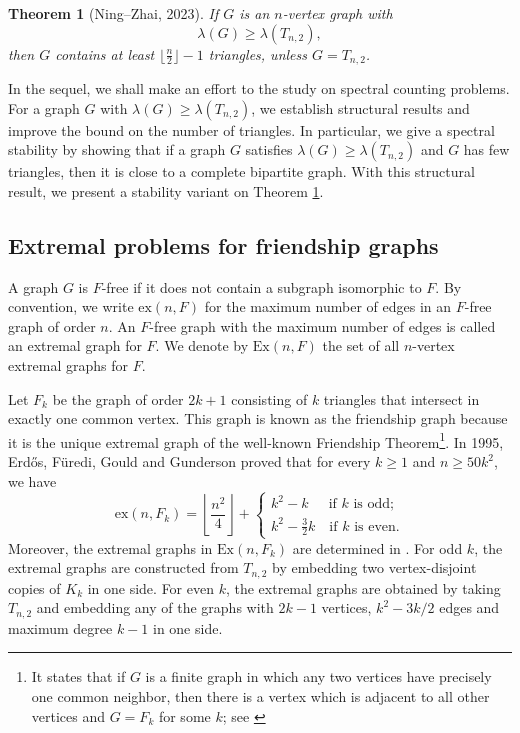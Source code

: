 \documentclass[11pt]{article}
\newtheorem{theorem}{Theorem}[section]
\begin{document}
\begin{theorem}[Ning--Zhai, 2023] \label{thmNZ2021}
If $G$ is an $n$-vertex graph  with 
\[   \lambda (G) \ge \lambda (T_{n,2}), \]  
then  $G$ contains at least 
$ \lfloor \frac{n}{2} \rfloor -1 $ triangles, 
unless $G=T_{n,2}$.  
\end{theorem} 



In the sequel, we shall make an effort
 to the study on spectral counting problems. 
 For a graph $G$ with $\lambda (G)\ge 
 \lambda (T_{n,2})$, 
 we establish structural results and improve the bound on the number of triangles.   
In particular, we give a spectral stability by showing that if 
a graph $G$ satisfies $\lambda (G) \ge \lambda(T_{n,2})$ 
and $G$ has few triangles, 
then it is close to a complete bipartite graph. 
With this structural result, we present a stability variant on Theorem \ref{thmNZ2021}. 



\subsection{Extremal problems for friendship graphs} 

\label{sub-sec1-2}

A graph $G$ is $F$-free if it does not contain a subgraph isomorphic to $F$.  
 By convention, we write $\mathrm{ex}(n,F)$ for 
the maximum number of edges in an $F$-free graph of order $n$. 
An $F$-free graph 
with the maximum number of edges 
is called an extremal graph for $F$. 
We denote by $\mathrm{Ex}(n,F)$ 
the set of all $n$-vertex extremal graphs for $F$. 

\medskip 
Let $F_k$ be the graph of order $2k+1$ 
consisting of $k$ triangles
that intersect in exactly one common vertex.
This graph is known as the friendship graph
because it is the unique extremal graph of the
well-known Friendship Theorem\footnote{It states that if $G$ is a finite graph in which any two vertices have
precisely one common neighbor, then there is a vertex which is adjacent to
all other vertices and  $G=F_k$ for some $k$; see \cite[page 307]{AZ2014}}. 
In 1995, Erd\H{o}s, F\"{u}redi,
Gould and Gunderson \cite{Erdos95} proved that  
for every $k \geq 1$ and $n\geq 50k^2$, we have 
\[ \mathrm{ex}(n, F_k)= \left\lfloor \frac {n^2}{4}\right \rfloor+ \left\{
\begin{array}{ll}
k^2-k \quad~~  \mbox{if $k$ is odd; } \\
k^2-\frac32 k \quad \mbox{if $k$ is even}.
\end{array}
\right. \] 
Moreover, the extremal graphs in $\mathrm{Ex}(n,F_k)$  
 are determined in \cite{Erdos95}. For odd $k$,
the extremal graphs are constructed from $T_{n,2}$
by embedding two vertex-disjoint copies of $K_k$ in one side. 
For even $k$, the extremal graphs
are obtained by taking $T_{n,2}$ and embedding
any of the graphs with $2k-1$ vertices, $k^2- {3}k/2$ edges and maximum degree $k-1$ in one side. 
\end{document}
